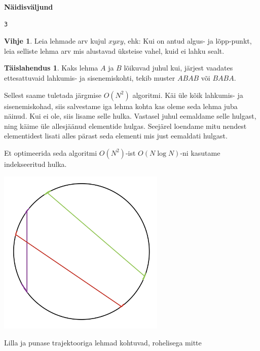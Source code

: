 \documentclass{trkut}
\theoremstyle{definition}
\newtheorem*{vihje}{Vihje}
\newtheorem*{solution}{Täislahendus}
\begin{document}
\textbf{Näidisväljund}

\begin{verbatim}
3
\end{verbatim}


\begin{vihje}
Leia lehmade arv kujul $xyxy$, ehk:
Kui on antud algus- ja lõpp-punkt, leia selliste lehma arv mis alustavad üksteise vahel, kuid ei lahku sealt.
\end{vihje}

\begin{solution}
Kaks lehma $A$ ja $B$  lõikuvad juhul kui, järjest vaadates ettesattuvaid lahkumis- ja sisenemiskohti, tekib muster $ABAB$ või $BABA$. 

Sellest saame tuletada järgmise $O(N^2)$ algoritmi. Käi üle kõik lahkumis- ja sisenemiskohad, siis salvestame iga lehma kohta kas oleme seda lehma juba näinud.
Kui ei ole, siis lisame selle hulka. Vastasel juhul eemaldame selle hulgast, ning käime üle allesjäänud elementide hulgas. Seejärel loendame mitu nendest elementidest lisati alles pärast seda elementi mis just eemaldati hulgast.

Et optimeerida seda algoritmi $O(N^2)$-ist $O(N\log N)$-ni kasutame indekseeritud hulka.
\begin{kk}[H]%
    \includegraphics[width=8cm]{lehm.png}%
    \caption{Lilla ja punase trajektooriga lehmad kohtuvad, rohelisega mitte}%
    \label{EMaxx}%
\end{kk}
\end{solution}
\end{document}
